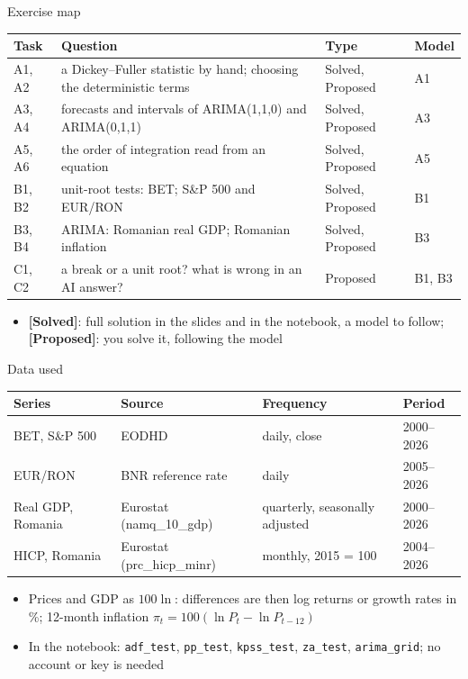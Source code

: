 \begin{frame}{Exercise map}
\itemsize{\small}
\begin{center}
\footnotesize
\begin{tabular}{>{\raggedright\arraybackslash}p{1.1cm}>{\raggedright\arraybackslash}p{7.5cm}>{\raggedright\arraybackslash}p{1.9cm}>{\raggedright\arraybackslash}p{1.4cm}}
\toprule
\textbf{Task} & \textbf{Question} & \textbf{Type} & \textbf{Model} \\
\midrule
A1, A2 & a Dickey--Fuller statistic by hand; choosing the deterministic terms & Solved, Proposed & A1 \\
A3, A4 & forecasts and intervals of ARIMA(1,1,0) and ARIMA(0,1,1) & Solved, Proposed & A3 \\
A5, A6 & the order of integration read from an equation & Solved, Proposed & A5 \\
B1, B2 & unit-root tests: BET; S\&P 500 and EUR/RON & Solved, Proposed & B1 \\
B3, B4 & ARIMA: Romanian real GDP; Romanian inflation & Solved, Proposed & B3 \\
C1, C2 & a break or a unit root? what is wrong in an AI answer? & Proposed & B1, B3 \\
\bottomrule
\end{tabular}
\end{center}
\begin{itemize}
    \item \textbf{[Solved]}: full solution in the slides and in the notebook, a model to follow; \textbf{[Proposed]}: you solve it, following the model
\end{itemize}
\end{frame}

\begin{frame}{Data used}
\itemsize{\small}
\begin{center}
\footnotesize
\begin{tabular}{llll}
\toprule
\textbf{Series} & \textbf{Source} & \textbf{Frequency} & \textbf{Period} \\
\midrule
BET, S\&P 500 & EODHD & daily, close & 2000--2026 \\
EUR/RON & BNR reference rate & daily & 2005--2026 \\
Real GDP, Romania & Eurostat (namq\_10\_gdp) & quarterly, seasonally adjusted & 2000--2026 \\
HICP, Romania & Eurostat (prc\_hicp\_minr) & monthly, 2015 = 100 & 2004--2026 \\
\bottomrule
\end{tabular}
\end{center}
\begin{itemize}
    \item Prices and GDP as $100\ln$: differences are then log returns or growth rates in \%; 12-month inflation $\pi_t = 100(\ln P_t - \ln P_{t-12})$
    \item In the notebook: \texttt{adf\_test}, \texttt{pp\_test}, \texttt{kpss\_test}, \texttt{za\_test}, \texttt{arima\_grid}; no account or key is needed
\end{itemize}
\end{frame}


